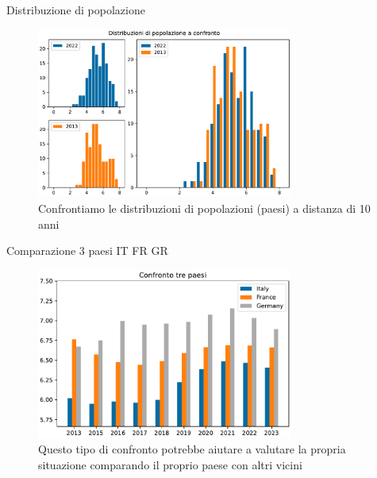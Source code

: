 \documentclass{beamer}
\begin{document}
\begin{frame}{Distribuzione di popolazione}
	\begin{figure}
		\centering
		\includegraphics[width=0.75\textwidth]{"./img/2DistribuzioniPopolazioni.pdf"}
		\caption{Confrontiamo le distribuzioni di popolazioni (paesi) a distanza di 10 anni}
		\label{fig:pdf}
	\end{figure}
\end{frame}

\begin{frame}{Comparazione 3 paesi IT FR GR}
	\begin{figure}
		\centering
		\includegraphics[width=0.75\textwidth]{"./img/3ComparoPaesi_Italy_France_Germany.pdf"}
		\caption{Questo tipo di confronto potrebbe aiutare a valutare la propria situazione comparando il proprio paese con altri vicini}
	\end{figure}
\end{frame}
\end{document}
